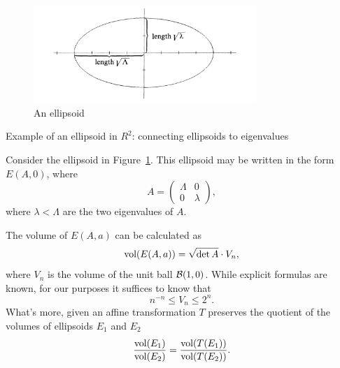 \begin{figure}[t]
  \centering
  \includegraphics[width=0.75\textwidth]{img/ellipsoid}
  \caption{An ellipsoid}
  \label{fig:ellipsoid-eigenvalue}
\end{figure}
\begin{examplebox}{Example of an ellipsoid in \(R^2\): connecting ellipsoids to
  eigenvalues}
  \begin{example} Consider the ellipsoid in
    Figure~\ref{fig:ellipsoid-eigenvalue}. This ellipsoid may be written in the
    form \(E(A,0)\), where
    \[A = \left(\begin{matrix}
      \Lambda & 0\\
      0 & \lambda
    \end{matrix}\right),\]
    where \(\lambda < \Lambda\) are the two eigenvalues of \(A\).
  \end{example}
\end{examplebox}

\begin{fact}
  The volume of \(E(A,a)\) can be calculated as
  \[\textnormal{vol}(E(A, a)) = \sqrt{\det A} \cdot V_n,\]
  where \(V_n\) is the volume of the unit ball \(\mathcal{B}(1,0)\). While explicit
  formulas are known, for our purposes it suffices to know that
  \[n^{-n} \leq V_n \leq 2^n.\]
  What's more, given an affine transformation \(T\) preserves the quotient of
  the volumes of ellipsoids \(E_1\) and \(E_2\)
  \[\frac{\textnormal{vol}(E_1)}{\textnormal{vol}(E_2)} = \frac{\textnormal{vol}(T(E_1))}{\textnormal{vol}(T(E_2))}.\]
\end{fact}

